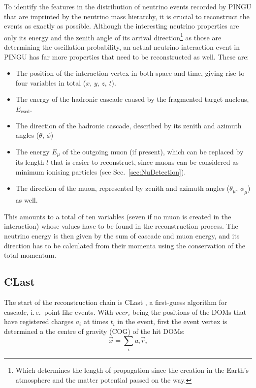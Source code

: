 To identify the features in the distribution of neutrino events recorded by
PINGU that are imprinted by the neutrino mass hierarchy, it is crucial to
reconstruct the events as exactly as possible. Although the interesting neutrino
properties are only its energy and the zenith angle of its arrival
direction\footnote{Which determines the length of propagation since the
creation in the Earth's atmosphere and the matter potential passed on the way.}
as those are determining the oscillation probability, an actual neutrino
interaction event in PINGU has far more properties that need to be
reconstructed as well. These are:
\begin{itemize}
 \item The position of the interaction vertex in both space and time, giving
  rise to four variables in total ($x,\,y,\,z,\,t$).
 \item The energy of the hadronic cascade caused by the fragmented target
  nucleus, $E_\mathrm{cscd}$.
 \item The direction of the hadronic cascade, described by its zenith and
  azimuth angles ($\theta,\,\phi$)
 \item The energy $E_\mu$ of the outgoing muon (if present), which can be
  replaced by its length $l$ that is easier to reconstruct, since muons can be
  considered as minimum ionising particles (see Sec.~\ref{sec:NuDetection}).
 \item The direction of the muon, represented by zenith and azimuth angles
  ($\theta_\mu,\,\phi_\mu$) as well.
\end{itemize}
This amounts to a total of ten variables (seven if no muon is created in the
interaction) whose values have to be found in the reconstruction process. The
neutrino energy is then given by the sum of cascade and muon energy, and its
direction has to be calculated from their momenta using the conservation of the
total momentum. 

\subsection{CLast}
\label{sec:reco_clast}

The start of the reconstruction chain is CLast \cite{CLast}, a first-guess
algorithm for cascade, i.\,e.\ point-like events. With $vec{r}_i$ being the
positions of the DOMs that have registered charges $a_i$ at times $t_i$ in the
event, first the event vertex is determined a the centre of gravity (COG) of the
hit DOMs:
\begin{equation}
 \vec{x} = \sum_i a_i \vec{r}_i
\end{equation}

